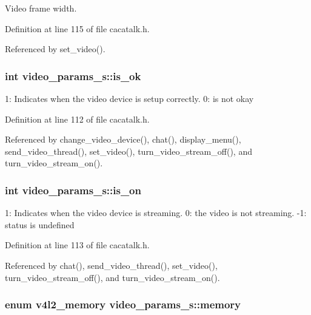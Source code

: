 \-Video frame width. 



\-Definition at line 115 of file cacatalk.\-h.



\-Referenced by set\-\_\-video().

\hypertarget{structvideo__params__s_a244777435afe8e2ffd40d1919e47abcb}{
\subsubsection[{is\-\_\-ok}]{\setlength{\rightskip}{0pt plus 5cm}int {\bf video\-\_\-params\-\_\-s\-::is\-\_\-ok}}}\label{structvideo__params__s_a244777435afe8e2ffd40d1919e47abcb}


1\-: \-Indicates when the video device is setup correctly. 0\-: is not okay 



\-Definition at line 112 of file cacatalk.\-h.



\-Referenced by change\-\_\-video\-\_\-device(), chat(), display\-\_\-menu(), send\-\_\-video\-\_\-thread(), set\-\_\-video(), turn\-\_\-video\-\_\-stream\-\_\-off(), and turn\-\_\-video\-\_\-stream\-\_\-on().

\hypertarget{structvideo__params__s_a09a2674567a028e8984acac16ccc8a8f}{
\subsubsection[{is\-\_\-on}]{\setlength{\rightskip}{0pt plus 5cm}int {\bf video\-\_\-params\-\_\-s\-::is\-\_\-on}}}\label{structvideo__params__s_a09a2674567a028e8984acac16ccc8a8f}


1\-: \-Indicates when the video device is streaming. 0\-: the video is not streaming. -\/1\-: status is undefined 



\-Definition at line 113 of file cacatalk.\-h.



\-Referenced by chat(), send\-\_\-video\-\_\-thread(), set\-\_\-video(), turn\-\_\-video\-\_\-stream\-\_\-off(), and turn\-\_\-video\-\_\-stream\-\_\-on().

\hypertarget{structvideo__params__s_ac54e2e0bd136b84eff239a49a8b11afa}{
\subsubsection[{memory}]{\setlength{\rightskip}{0pt plus 5cm}enum v4l2\-\_\-memory {\bf video\-\_\-params\-\_\-s\-::memory}}}\label{structvideo__params__s_ac54e2e0bd136b84eff239a49a8b11afa}


